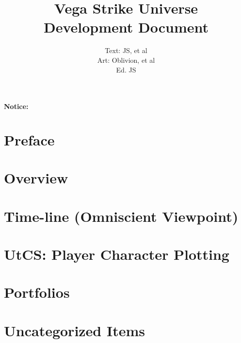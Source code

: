 

\title{Vega Strike Universe \\ 
Development Document}

\author{Text: JS, et al\\
Art: Oblivion, et al \\
Ed. JS}

\renewcommand{\thepage}{\roman{page}}
\maketitle
\renewcommand{\thepage}{\arabic{page}}
\thispagestyle{empty}
\centerline{\bf {\Huge Notice:}}
{\it

}

\setcounter{tocdepth}{2}
\clearpage
{}
\tableofcontents
\listoftables
{}
\listoffigures
{}

\chapter*{Preface}


\chapter{Overview}


\chapter{Time-line (Omniscient Viewpoint)}


\chapter{UtCS: Player Character Plotting}


\chapter{Portfolios}


\chapter{Uncategorized Items}



